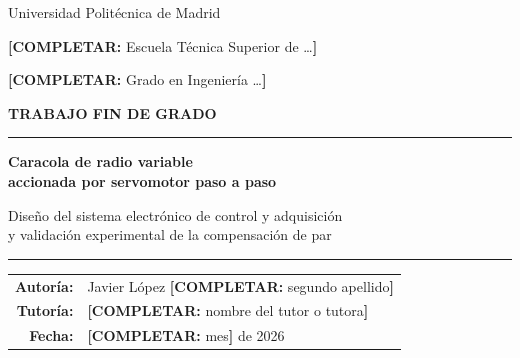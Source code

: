 \documentclass[11pt,a4paper,twoside,openright]{report}
\DeclareRobustCommand{\completar}[1]{\textcolor{red!75!black}{\textbf{[COMPLETAR:} #1\textbf{]}}}
\newcommand{\autortfg}{Javier López \completar{segundo apellido}}
\newcommand{\tutortfg}{\completar{nombre del tutor o tutora}}
\newcommand{\gradotfg}{\completar{Grado en Ingeniería \ldots}}
\newcommand{\escuelatfg}{\completar{Escuela Técnica Superior de \ldots}}
\newcommand{\universidadtfg}{Universidad Politécnica de Madrid}
\newcommand{\fechatfg}{\completar{mes} de 2026}
\begin{document}
\begin{titlepage}
  \centering
  {\large \universidadtfg\par}
  \vspace{2mm}
  {\large \escuelatfg\par}
  \vspace{2cm}
  {\Large \gradotfg\par}
  \vspace{1.2cm}
  {\Large\bfseries TRABAJO FIN DE GRADO\par}
  \vspace{1.5cm}
  \rule{\linewidth}{0.8pt}\par\vspace{4mm}
  {\LARGE\bfseries Caracola de radio variable\\[1mm] accionada por servomotor paso a paso\par}
  \vspace{5mm}
  {\large Diseño del sistema electrónico de control y adquisición\\ y validación experimental de la compensación de par\par}
  \vspace{4mm}\rule{\linewidth}{0.8pt}\par
  \vfill
  \begin{tabular}{rl}
    \textbf{Autoría:} & \autortfg \\[2mm]
    \textbf{Tutoría:} & \tutortfg \\[2mm]
    \textbf{Fecha:}   & \fechatfg \\
  \end{tabular}
  \vspace{2cm}
\end{titlepage}
\cleardoublepage



\tableofcontents
\cleardoublepage
\listoffigures
\cleardoublepage
\listoftables
\cleardoublepage


\cleardoublepage
{}













\cleardoublepage
{}
{}


\appendix






\end{document}
